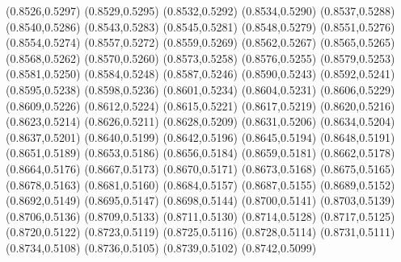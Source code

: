 \PST@Filltriangle(0.8526,0.5297)
\PST@Filltriangle(0.8529,0.5295)
\PST@Filltriangle(0.8532,0.5292)
\PST@Filltriangle(0.8534,0.5290)
\PST@Filltriangle(0.8537,0.5288)
\PST@Filltriangle(0.8540,0.5286)
\PST@Filltriangle(0.8543,0.5283)
\PST@Filltriangle(0.8545,0.5281)
\PST@Filltriangle(0.8548,0.5279)
\PST@Filltriangle(0.8551,0.5276)
\PST@Filltriangle(0.8554,0.5274)
\PST@Filltriangle(0.8557,0.5272)
\PST@Filltriangle(0.8559,0.5269)
\PST@Filltriangle(0.8562,0.5267)
\PST@Filltriangle(0.8565,0.5265)
\PST@Filltriangle(0.8568,0.5262)
\PST@Filltriangle(0.8570,0.5260)
\PST@Filltriangle(0.8573,0.5258)
\PST@Filltriangle(0.8576,0.5255)
\PST@Filltriangle(0.8579,0.5253)
\PST@Filltriangle(0.8581,0.5250)
\PST@Filltriangle(0.8584,0.5248)
\PST@Filltriangle(0.8587,0.5246)
\PST@Filltriangle(0.8590,0.5243)
\PST@Filltriangle(0.8592,0.5241)
\PST@Filltriangle(0.8595,0.5238)
\PST@Filltriangle(0.8598,0.5236)
\PST@Filltriangle(0.8601,0.5234)
\PST@Filltriangle(0.8604,0.5231)
\PST@Filltriangle(0.8606,0.5229)
\PST@Filltriangle(0.8609,0.5226)
\PST@Filltriangle(0.8612,0.5224)
\PST@Filltriangle(0.8615,0.5221)
\PST@Filltriangle(0.8617,0.5219)
\PST@Filltriangle(0.8620,0.5216)
\PST@Filltriangle(0.8623,0.5214)
\PST@Filltriangle(0.8626,0.5211)
\PST@Filltriangle(0.8628,0.5209)
\PST@Filltriangle(0.8631,0.5206)
\PST@Filltriangle(0.8634,0.5204)
\PST@Filltriangle(0.8637,0.5201)
\PST@Filltriangle(0.8640,0.5199)
\PST@Filltriangle(0.8642,0.5196)
\PST@Filltriangle(0.8645,0.5194)
\PST@Filltriangle(0.8648,0.5191)
\PST@Filltriangle(0.8651,0.5189)
\PST@Filltriangle(0.8653,0.5186)
\PST@Filltriangle(0.8656,0.5184)
\PST@Filltriangle(0.8659,0.5181)
\PST@Filltriangle(0.8662,0.5178)
\PST@Filltriangle(0.8664,0.5176)
\PST@Filltriangle(0.8667,0.5173)
\PST@Filltriangle(0.8670,0.5171)
\PST@Filltriangle(0.8673,0.5168)
\PST@Filltriangle(0.8675,0.5165)
\PST@Filltriangle(0.8678,0.5163)
\PST@Filltriangle(0.8681,0.5160)
\PST@Filltriangle(0.8684,0.5157)
\PST@Filltriangle(0.8687,0.5155)
\PST@Filltriangle(0.8689,0.5152)
\PST@Filltriangle(0.8692,0.5149)
\PST@Filltriangle(0.8695,0.5147)
\PST@Filltriangle(0.8698,0.5144)
\PST@Filltriangle(0.8700,0.5141)
\PST@Filltriangle(0.8703,0.5139)
\PST@Filltriangle(0.8706,0.5136)
\PST@Filltriangle(0.8709,0.5133)
\PST@Filltriangle(0.8711,0.5130)
\PST@Filltriangle(0.8714,0.5128)
\PST@Filltriangle(0.8717,0.5125)
\PST@Filltriangle(0.8720,0.5122)
\PST@Filltriangle(0.8723,0.5119)
\PST@Filltriangle(0.8725,0.5116)
\PST@Filltriangle(0.8728,0.5114)
\PST@Filltriangle(0.8731,0.5111)
\PST@Filltriangle(0.8734,0.5108)
\PST@Filltriangle(0.8736,0.5105)
\PST@Filltriangle(0.8739,0.5102)
\PST@Filltriangle(0.8742,0.5099)
